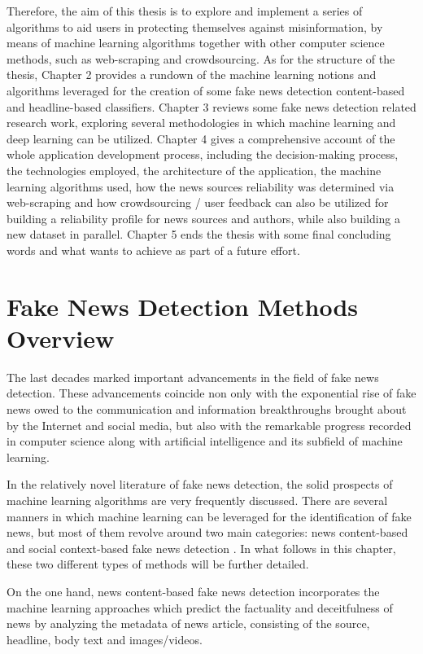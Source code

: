 \documentclass[12pt, a4paper]{article}
\begin{document}
    Therefore, the aim of this thesis is to explore and implement a series of algorithms to aid users in protecting themselves against misinformation, by means of machine learning algorithms together with other computer science methods, such as web-scraping and crowdsourcing. As for the structure of the thesis, Chapter 2 provides a rundown of the machine learning notions and algorithms leveraged for the creation of some fake news detection content-based and headline-based classifiers. Chapter 3 reviews some fake news detection related research work, exploring several methodologies in which machine learning and deep learning can be utilized. Chapter 4 gives a comprehensive account of the whole application development process, including the decision-making process, the technologies employed, the architecture of the application, the machine learning algorithms used, how the news sources reliability was determined via web-scraping and how crowdsourcing / user feedback can also be utilized for building a reliability profile for news sources and authors, while also building a new dataset in parallel. Chapter 5 ends the thesis with some final concluding words and what wants to achieve as part of a future effort.
  \newpage

  

  \newpage
  \section{Fake News Detection Methods Overview}
    The last decades marked important advancements in the field of fake news detection. These advancements coincide non only with the exponential rise of fake news owed to the communication and information breakthroughs brought about by the Internet and social media, but also with the remarkable progress recorded in computer science along with artificial intelligence and its subfield of machine learning.

    In the relatively novel literature of fake news detection, the solid prospects of machine learning algorithms are very frequently discussed. There are several manners in which machine learning can be leveraged for the identification of fake news, but most of them revolve around two main categories: news content-based and social context-based fake news detection \cite{a2}. In what follows in this chapter, these two different types of methods will be further detailed.

    On the one hand, news content-based fake news detection incorporates the machine learning approaches which predict the factuality and deceitfulness of news by analyzing the metadata of news article, consisting of the source, headline, body text and images/videos.
\end{document}
